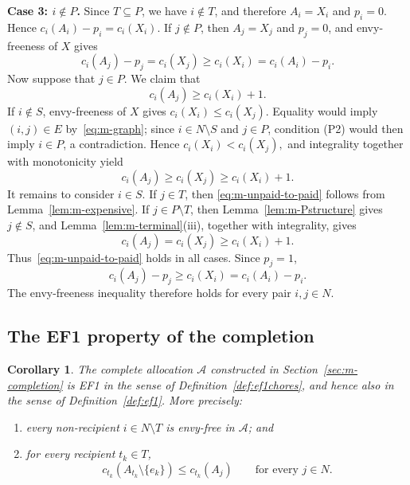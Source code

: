 \documentclass[11pt]{article}
\makeatletter
\theoremstyle{plain}
\newtheorem{corollary}{Corollary}
\theoremstyle{plain}
\renewenvironment{proof}[1][\proofname]{\par
  \pushQED{\qed}%
  \normalfont \topsep6\p@\@plus6\p@\relax
  \trivlist
  \item[\hskip\labelsep\bfseries #1\@addpunct{}]\ignorespaces
}{%
  \popQED\endtrivlist\@endpefalse
}
\newcommand{\agents}{N}                       %
\newcommand{\subsidy}{p}                      %
\newcommand{\cost}{c}
\makeatother
\begin{document}
\begin{proof}
\smallskip
\noindent\textbf{Case 3: $i\notin P$.}
Since $T\subseteq P$, we have $i\notin T$, and therefore $A_i=X_i$ and $\subsidy_i=0$. Hence \(\cost_i(A_i)-\subsidy_i=\cost_i(X_i). \) If $j\notin P$, then $A_j=X_j$ and $\subsidy_j=0$, and envy-freeness of $X$ gives
\[
    \cost_i(A_j)-\subsidy_j
    =\cost_i(X_j)
    \geq\cost_i(X_i)=\cost_i(A_i)-\subsidy_i.
\]
Now suppose that $j\in P$. We claim that
\begin{equation}
\label{eq:m-unpaid-to-paid}
    \cost_i(A_j)\geq \cost_i(X_i)+1.
\end{equation}
If $i\notin S$, envy-freeness of $X$ gives $\cost_i(X_i)\leq\cost_i(X_j)$. Equality would imply $(i,j)\in E$ by~\eqref{eq:m-graph}; since $i\in\agents\setminus S$ and $j\in P$, condition \textnormal{(P2)} would then imply $i\in P$, a contradiction. Hence \(\cost_i(X_i)<\cost_i(X_j), \) and integrality together with monotonicity yield
\[
\cost_i(A_j)\geq\cost_i(X_j)\geq\cost_i(X_i)+1.
\] It remains to consider $i\in S$. If $j\in T$, then \eqref{eq:m-unpaid-to-paid} follows from Lemma~\ref{lem:m-expensive}. If $j\in P\setminus T$, then Lemma~\ref{lem:m-Pstructure} gives $j\notin S$, and Lemma~\ref{lem:m-terminal}(iii), together with integrality, gives
\[
    \cost_i(A_j)=\cost_i(X_j)\geq\cost_i(X_i)+1.
\]
Thus~\eqref{eq:m-unpaid-to-paid} holds in all cases. Since $\subsidy_j=1$,
\[
    \cost_i(A_j)-\subsidy_j
    \geq\cost_i(X_i)
    =\cost_i(A_i)-\subsidy_i.
\]
The envy-freeness inequality therefore holds for every pair $i,j\in\agents$. \end{proof}

\subsection{The EF1 property of the completion}


\begin{corollary}
\label{cor:ef1}
The complete allocation $\mathcal{A}$ constructed in Section~\ref{sec:m-completion} is EF1 in the sense of Definition~\ref{def:ef1chores}, and hence also in the sense of Definition~\ref{def:ef1}. More precisely:
\begin{enumerate}
    \item [(i)] every non-recipient $i\in N\setminus T$ is envy-free in  $\mathcal{A}$; and
    \item [(ii)] for every recipient $t_k\in T$,
    \[ c_{t_k}(A_{t_k}\setminus\{e_k\}) \leq c_{t_k}(A_j) \qquad\text{for every }j\in N.
    \]
\end{enumerate}
\end{corollary}
\end{document}
